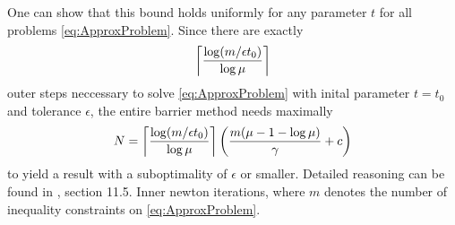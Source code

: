 One can show
that this bound holds uniformly for any parameter $ t $ for all problems \eqref{eq:ApproxProblem}.
 Since there are exactly \[ \ceil*{ \frac{\log(m/\epsilon t_0)}{\log \mu}} \] outer steps neccessary to solve  \eqref{eq:ApproxProblem} with inital parameter $ t=t_0  $ and tolerance $ \epsilon $, the entire barrier method needs maximally
 \[ N = \ceil*{\frac{\log(m/\epsilon t_0)}{\log \mu}}\left( \frac{m(\mu - 1 -\log \mu)}{\gamma} + c\right)  \]    to yield a result with a suboptimality of $ \epsilon $ or smaller. Detailed reasoning can be found in \cite{BV}, section 11.5. Inner newton iterations, where $ m $ denotes the number of inequality constraints on  \eqref{eq:ApproxProblem}.







